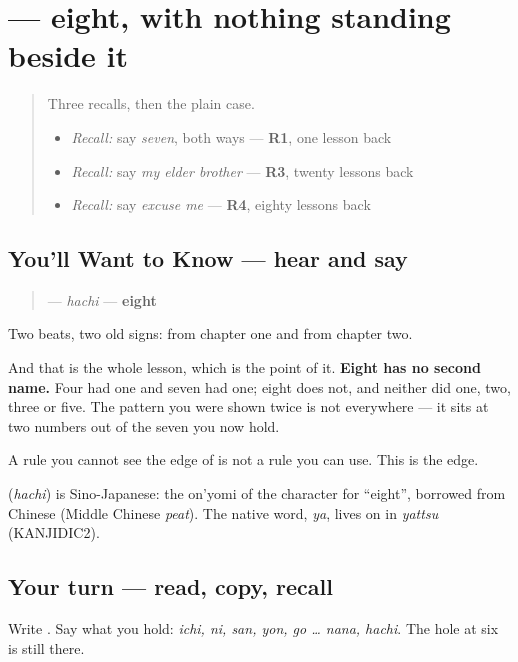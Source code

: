 \section[\texorpdfstring{\ja{はち} (hachi)}{はち (hachi)}]{ — eight, with nothing standing beside it}

\label{lesson:JA-C15-hachi}



\begin{quote}
Three recalls, then the plain case.

\begin{itemize}
\raggedright
  \item \emph{Recall:} say \emph{seven}, both ways — \textbf{R1}, one lesson back
  \item \emph{Recall:} say \emph{my elder brother} — \textbf{R3}, twenty lessons back
  \item \emph{Recall:} say \emph{excuse me} — \textbf{R4}, eighty lessons back
\end{itemize}
\end{quote}

\subsection*{You'll Want to Know — hear and say}
\begin{quote}
\textbf{} — \emph{hachi} — \textbf{eight}
\end{quote}

Two beats, two old signs: \textbf{} from chapter one and \textbf{} from chapter two.

And that is the whole lesson, which is the point of it. \textbf{Eight has no second name.} Four had one and seven had one; eight does not, and neither did one, two, three or five. The pattern you were shown twice is not everywhere — it sits at two numbers out of the seven you now hold.

A rule you cannot see the edge of is not a rule you can use. This is the edge.

\begin{cousinweb}
\textbf{} (\emph{hachi}) is Sino-Japanese: the on'yomi of the character for \textquotedblleft{}eight\textquotedblright{}, borrowed from Chinese (Middle Chinese \emph{peat}). The native word, \emph{ya}, lives on in \emph{yattsu} (KANJIDIC2).
\end{cousinweb}

\subsection*{Your turn — read, copy, recall}
Write \textbf{}. Say what you hold: \emph{ichi, ni, san, yon, go … nana, hachi}. The hole at six is still there.

